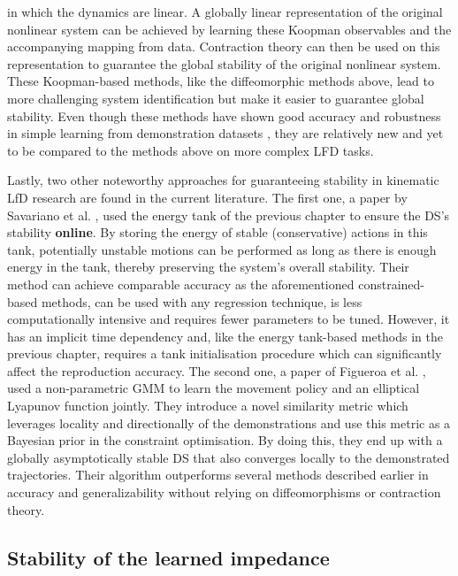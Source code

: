 in which the dynamics are linear. A globally linear representation of the original nonlinear system can be achieved by learning these Koopman observables and the accompanying mapping from data. Contraction theory can then be used on this representation to guarantee the global stability of the original nonlinear system. These Koopman-based methods, like the diffeomorphic methods above, lead to more challenging system identification but make it easier to guarantee global stability. Even though these methods have shown good accuracy and robustness in simple learning from demonstration datasets \cite{fanLearningStableKoopman2021,bevandaDiffeomorphicallyLearningStable2022}, they are relatively new and yet to be compared to the methods above on more complex LFD tasks.

Lastly, two other noteworthy approaches for guaranteeing stability in kinematic LfD research are found in the current literature. The first one, a paper by Savariano et al. \cite{saverianoEnergybasedApproachEnsure2020}, used the energy tank of the previous chapter to ensure the DS's stability \textbf{online}. By storing the energy of stable (conservative) actions in this tank, potentially unstable motions can be performed as long as there is enough energy in the tank, thereby preserving the system's overall stability. Their method can achieve comparable accuracy as the aforementioned constrained-based methods, can be used with any regression technique, is less computationally intensive and requires fewer parameters to be tuned. However, it has an implicit time dependency and, like the energy tank-based methods in the previous chapter, requires a tank initialisation procedure which can significantly affect the reproduction accuracy. The second one, a paper of Figueroa et al. \cite{figueroafernandezPhysicallyconsistentBayesianNonparametric2018}, used a non-parametric GMM to learn the movement policy and an elliptical Lyapunov function jointly. They introduce a novel similarity metric which leverages locality and directionally of the demonstrations and use this metric as a Bayesian prior in the constraint optimisation. By doing this, they end up with a globally asymptotically stable DS that also converges locally to the demonstrated trajectories. Their algorithm outperforms several methods described earlier in accuracy and generalizability without relying on diffeomorphisms or contraction theory.

\subsection{Stability of the learned impedance}

